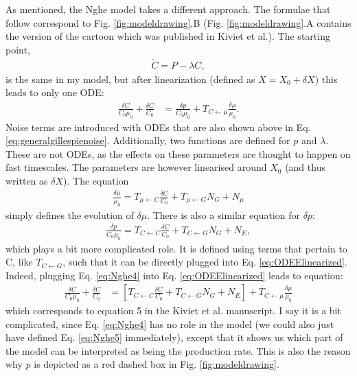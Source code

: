 As mentioned, the Nghe model takes a different approach. 
The formulae that follow correspond to Fig. \ref{fig:modeldrawing}.B (Fig. \ref{fig:modeldrawing}.A contains the version of the cartoon which was published in Kiviet et al.).
The starting point,
%
\begin{align}
\label{eq:Nghe1}
\dot{C} = P - \lambda C
,
\end{align}
%
is the same in my model, but after linearization (defined as $X=X_0+\delta X$) this leads to only one ODE:
%
\begin{align}
\label{eq:ODEElinearized}
\frac{ \delta{\dot{C}} }{C_0 \mu_0} 
+ \frac{\delta C}{C_0} 
& =
\frac{\delta p}{C_0 \mu_0} + T_{C \leftarrow \mu} \frac{\delta \mu}{\mu_0}
.
\end{align}
%
Noise terms are introduced with ODEs that are also shown above in Eq. \ref{eq:generalgillespienoise}.
 Additionally, two functions are defined for $p$ and $\lambda$. These are not ODEs, as the effects on these parameters are thought to happen on fast timescales. The parameters are however linearised around $X_0$ (and thus written as $\delta X$). The equation
%
\begin{align}
\label{eq:Nghe3}
\frac{\delta\mu}{\mu_0} = T_{\mu \leftarrow C} \frac{\delta C}{C_0} + T_{\mu \leftarrow G} N_G + N_\mu
\end{align}
%
simply defines the evolution of $\delta \mu$.
There is also a similar equation for $\delta p$:
%
\begin{align}
\label{eq:Nghe4}
\frac{\delta{p}}{C_0 \mu_0} = T_{C \leftarrow C} \frac{\delta C}{C_0} + T_{C \leftarrow G} N_G + N_E
,
\end{align}
%
which plays a bit more complicated role.
It is defined using terms that pertain to C, like $T_{C \leftarrow G}$, such that it can be directly plugged into Eq. \ref{eq:ODEElinearized}. 
Indeed, plugging Eq. \ref{eq:Nghe4} into Eq. \ref{eq:ODEElinearized} leads to equation:
%
\begin{align}
\label{eq:Nghe5}
\frac{ \delta{\dot{C}} }{C_0 \mu_0} 
+ \frac{\delta C}{C_0} 
& = 
\left[
 T_{C \leftarrow C} \frac{\delta C}{C_0} + T_{C \leftarrow G} N_G + N_E 
 \right]
 + T_{C \leftarrow \mu} \frac{\delta \mu}{\mu_0} 
\end{align}
%
which corresponds to equation 5 in the Kiviet et al. \cite{Kiviet2014} manuscript.
I say it is a bit complicated, since Eq. \ref{eq:Nghe4} has no role in the model (we could also just have defined Eq. \ref{eq:Nghe5} immediately), except that it shows us which part of the model can be interpreted as being the production rate.
This is also the reason why $p$ is depicted as a red dashed box in Fig. \ref{fig:modeldrawing}.


